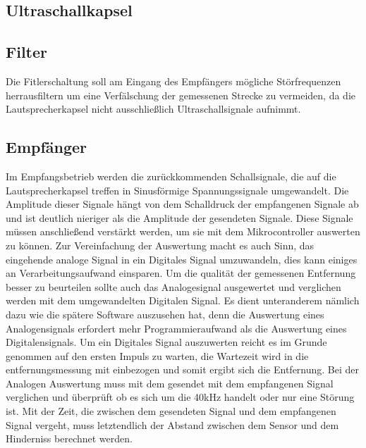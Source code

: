 \subsection{Ultraschallkapsel}

\subsection{Filter}
Die Fitlerschaltung soll am Eingang des Empfängers mögliche Störfrequenzen herrausfiltern um eine Verfälschung der gemessenen Strecke zu vermeiden, da die Lautsprecherkapsel nicht ausschließlich Ultraschallsignale aufnimmt.

\subsection{Empfänger}
Im Empfangsbetrieb werden die zurückkommenden Schallsignale, die auf die Lautsprecherkapsel treffen in Sinusförmige Spannungssignale umgewandelt. Die Amplitude dieser Signale hängt von dem Schalldruck der empfangenen Signale ab und ist deutlich nieriger als die Amplitude der gesendeten Signale. Diese Signale müssen anschließend verstärkt werden, um sie mit dem Mikrocontroller auswerten zu können. Zur Vereinfachung der Auswertung macht es auch Sinn, das eingehende analoge Signal in ein Digitales Signal umzuwandeln, dies kann einiges an Verarbeitungsaufwand einsparen. Um die qualität der gemessenen Entfernung besser zu beurteilen sollte auch das Analogesignal ausgewertet und verglichen werden mit dem umgewandelten Digitalen Signal. Es dient unteranderem nämlich dazu wie die spätere Software auszusehen hat, denn die Auswertung eines Analogensignals erfordert mehr Programmieraufwand als die Auswertung eines Digitalensignals. Um ein Digitales Signal auszuwerten reicht es im Grunde genommen auf den ersten Impuls zu warten, die Wartezeit wird in die entfernungsmessung mit einbezogen und somit ergibt sich die Entfernung. Bei der Analogen Auswertung muss mit dem gesendet mit dem empfangenen Signal verglichen und überprüft ob es sich um die 40kHz handelt oder nur eine Störung ist.
Mit der Zeit, die zwischen dem gesendeten Signal und dem empfangenen Signal vergeht, muss letztendlich der Abstand zwischen dem Sensor und dem Hinderniss berechnet werden.

